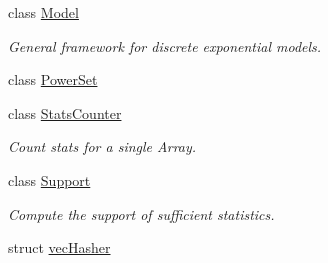 \begin{DoxyCompactItemize}
class \hyperlink{classbarry_1_1_model}{Model}
\begin{DoxyCompactList}\small\item\em General framework for discrete exponential models. \end{DoxyCompactList}\item 
class \hyperlink{classbarry_1_1_power_set}{Power\+Set}
\item 
class \hyperlink{classbarry_1_1_stats_counter}{Stats\+Counter}
\begin{DoxyCompactList}\small\item\em Count stats for a single Array. \end{DoxyCompactList}\item 
class \hyperlink{classbarry_1_1_support}{Support}
\begin{DoxyCompactList}\small\item\em Compute the support of sufficient statistics. \end{DoxyCompactList}\item 
struct \hyperlink{structbarry_1_1vec_hasher}{vec\+Hasher}
\end{DoxyCompactItemize}
